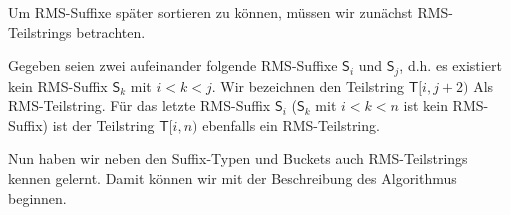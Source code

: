 Um RMS-Suffixe später sortieren zu können, müssen wir zunächst RMS-Teilstrings betrachten.

\begin{definition}
	Gegeben seien zwei aufeinander folgende RMS-Suffixe $\mathsf{S}_i$ und $\mathsf{S}_j$, d.h. es existiert kein RMS-Suffix $\mathsf{S}_k$ mit $i < k < j$. Wir bezeichnen den Teilstring $\mathsf{T}[i, j+2)$ Als RMS-Teilstring. Für das letzte RMS-Suffix $\mathsf{S}_i$ ($\mathsf{S}_k$ mit $ i < k < n$ ist kein RMS-Suffix) ist der Teilstring $\mathsf{T}[i, n)$ ebenfalls ein RMS-Teilstring.
\end{definition}

Nun haben wir neben den Suffix-Typen und Buckets auch RMS-Teilstrings kennen gelernt. Damit können wir mit der Beschreibung des Algorithmus beginnen.
